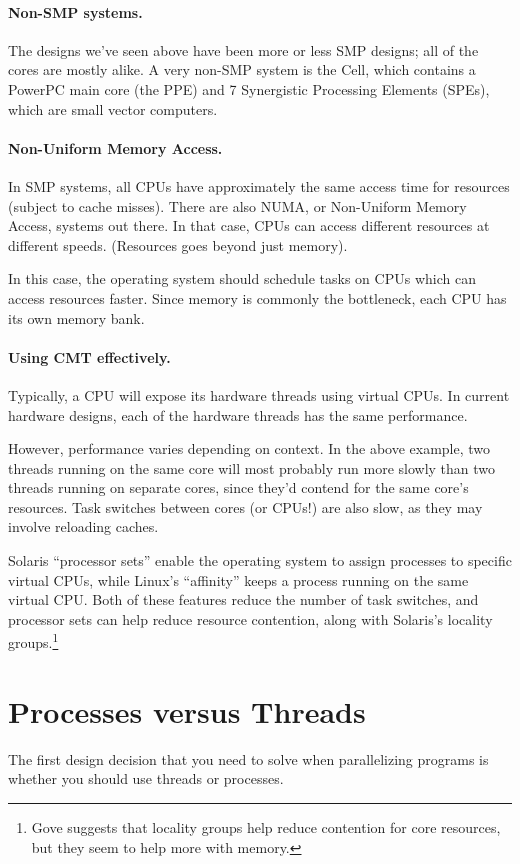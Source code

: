 \paragraph{Non-SMP systems.} The designs we've seen above have been
more or less SMP designs; all of the cores are mostly alike.
A very non-SMP system is the Cell, which contains a PowerPC main core
(the PPE) and 7 Synergistic Processing Elements (SPEs), which are
small vector computers.


\paragraph{Non-Uniform Memory Access.}
In SMP systems, all CPUs have approximately the same access time for resources
(subject to cache misses). There are also NUMA, or Non-Uniform Memory Access,
systems out there. In that case, CPUs can access different resources at different
speeds. (Resources goes beyond just memory).

In this case, the operating system should schedule tasks on CPUs which
can access resources faster.  Since memory is commonly the bottleneck,
each CPU has its own memory bank.

\paragraph{Using CMT effectively.} Typically, a CPU will expose its
hardware threads using virtual CPUs.
In current hardware designs, each of the hardware threads has the same
performance. 

However, performance varies depending on context. In the above
example, two threads running on the same core will most probably run
more slowly than two threads running on separate cores, since they'd
contend for the same core's resources. Task switches between cores (or
CPUs!) are also slow, as they may involve reloading caches.

Solaris ``processor sets''
enable the operating system to assign processes to specific virtual CPUs,
while Linux's ``affinity'' keeps a process running on the same virtual CPU.
Both of these features reduce the number of task switches, and processor
sets can help reduce resource contention, along with Solaris's locality
groups.\footnote{Gove suggests that locality groups help reduce contention
for core resources, but they seem to help more with memory.}

\section*{Processes versus Threads}
The first design decision that you need to solve when parallelizing programs
is whether you should use threads or processes.

